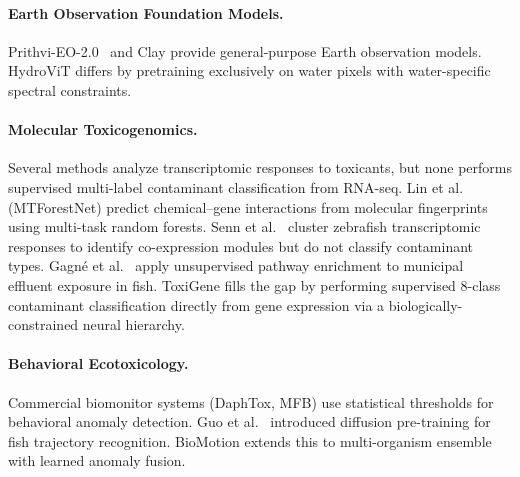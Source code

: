 \paragraph{Earth Observation Foundation Models.}
Prithvi-EO-2.0~\citep{Jakubik2024} and Clay provide general-purpose
Earth observation models. HydroViT differs by pretraining exclusively
on water pixels with water-specific spectral constraints.

\paragraph{Molecular Toxicogenomics.}
Several methods analyze transcriptomic responses to toxicants, but none
performs supervised multi-label contaminant classification from RNA-seq.
Lin et al.~\citep{Lin2024} (MTForestNet) predict chemical--gene
interactions from molecular fingerprints using multi-task random forests.
Senn et al.~\citep{Senn2021} cluster zebrafish transcriptomic responses
to identify co-expression modules but do not classify contaminant types.
Gagn{\'e} et al.~\citep{Gagne2025} apply unsupervised pathway enrichment
to municipal effluent exposure in fish. ToxiGene fills the gap by
performing supervised 8-class contaminant classification directly from
gene expression via a biologically-constrained neural hierarchy.

\paragraph{Behavioral Ecotoxicology.}
Commercial biomonitor systems (DaphTox, MFB) use statistical thresholds
for behavioral anomaly detection. Guo et al.~\citep{Guo2024} introduced
diffusion pre-training for fish trajectory recognition. BioMotion
extends this to multi-organism ensemble with learned anomaly fusion.
